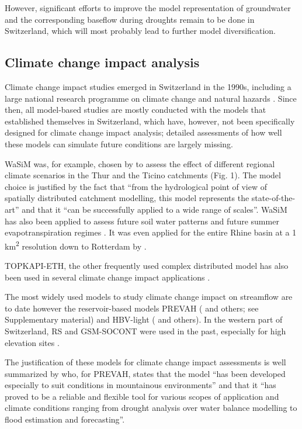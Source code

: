 \documentclass[10pt,a4paper]{article}
\begin{document}
However, significant efforts to improve the model representation of groundwater and the corresponding baseflow during droughts remain to be done in Switzerland, which will most probably lead to further model diversification.

\subsection{Climate change impact analysis}
\label{sec:application:climatechange}

Climate change impact studies emerged in Switzerland in the 1990s, including a large national research programme on climate change and natural hazards \citep{snfs}. Since then, all model-based studies are mostly conducted with the models that established themselves in Switzerland, which have, however, not been specifically designed for climate change impact analysis; detailed assessments of how well these models can simulate future conditions are largely missing.

WaSiM was, for example, chosen by \citet{Jasper2004} to assess the effect of different regional climate scenarios in the Thur and the Ticino catchments (Fig. 1). The model choice is justified by the fact that ``from the hydrological point of view of spatially distributed catchment modelling, this model represents the state-of-the-art'' and that it ``can be successfully applied to a wide range of scales''.  WaSiM has also been applied to assess future soil water patterns \citep{Jasper2006,Rossler2012} and future summer evapotranspiration regimes \citep{Calanca2006}. It was even applied for the entire Rhine basin at a 1 km\textsuperscript{2} resolution down to Rotterdam by \citet{Kleinn_2005}.

TOPKAPI-ETH, the other frequently used complex distributed model has also been used in several climate change impact applications \citep{Fatichi2014,Fatichi2015,Finger_2012,Anghileri2018}. 

{The most widely used models to study climate change impact on streamflow are to date however the reservoir-based models PREVAH (}\citealt{Koplin2012,Bosshard2013a,Speich_2015,Junker_2014} and others;  see Supplementary material) and HBV-light (\citealt{Etter2017,Hakala2020,Brunner_2018,Jenicek2018}  and others). In the western part of Switzerland, RS and GSM-SOCONT were used in the past, especially for high elevation sites \citep{Horton2006,Uhlmann_2012,Uhlmann2013a,Terrier2015}.

The justification of these models for climate change impact assessments is well summarized by \citet{K_plin_2010} who, for PREVAH, states that the model ``has been developed especially to suit conditions in mountainous environments'' and that it ``has proved to be a reliable and flexible tool for various scopes of application and climate conditions ranging from drought analysis over water balance modelling to flood estimation and forecasting''. 
\end{document}
